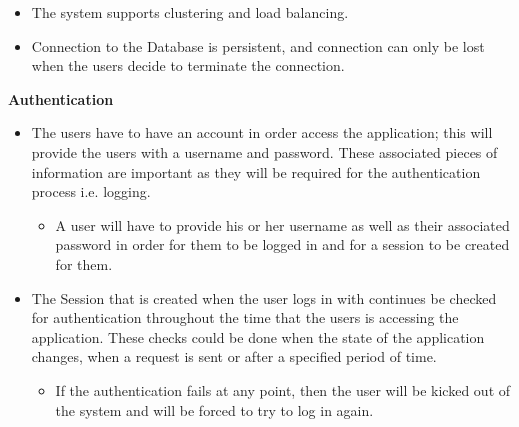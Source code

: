 \documentclass[10pt,a4paper]{article}
\begin{document}
                \begin{itemize}
                        \item The system supports clustering and load balancing.
                \end{itemize}
                \begin{itemize}
                        \item Connection to the Database is persistent, and connection can only be lost when the users decide to terminate the connection.\\
                \end{itemize}

\begin{center}\textbf{Authentication}\end{center}
                \begin{itemize}
                        \item The users have to have an account in order access the application; this will provide the users with a username and password. These associated pieces of information are important as they will be required for the authentication process i.e. logging.
                        \begin{itemize}
                                \item A user will have to provide his or her username as well as their associated password in order for them to be logged in and for a session to be created for them.
                        \end{itemize}
                \end{itemize}
                \begin{itemize}
                        \item The Session that is created when the user logs in with continues be checked for authentication throughout the time that the users is accessing the application. These checks could be done when the state of the application changes, when a request is sent or after a specified period of time.
                        \begin{itemize}
                                \item If the authentication fails at any point, then the user will be kicked out of the system and will be forced to try to log in again.
                        \end{itemize}
                \end{itemize}
\end{document}
